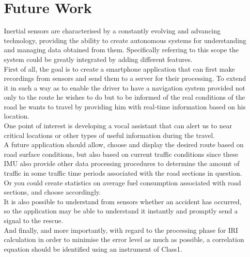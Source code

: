 \documentclass[tesi]{subfiles}
\begin{document}
\section{Future Work}
Inertial sensors are characterised by a constantly evolving and advancing technology, providing the ability to create autonomous systems for understanding and managing data obtained from them. Specifically referring to this scope the system could be greatly integrated by adding different features.\\
First of all, the goal is to create a smartphone application that can first make recordings from sensors and send them to a server for their processing. To extend it in such a way as to enable the driver to have a navigation system provided not only to the route he wishes to do but to be informed of the real conditions of the road he wants to travel by providing him with real-time information based on his location.\\
One point of interest is developing a vocal assistant that can alert us to near critical locations or other types of useful information during the travel.\\
A future application should allow, choose and display the desired route based on road surface conditions, but also based on current traffic conditions since these IMU also provide other data processing procedures to determine the amount of traffic in some traffic time periods associated with the road sections in question. Or you could create statistics on average fuel consumption associated with road sections, and choose accordingly.\\
It is also possible to understand from sensors whether an accident has occurred, so the application may be able to understand it instantly and promptly send a signal to the rescue.\\
And finally, and more importantly, with regard to the processing phase for IRI calculation in order to minimise the error level as much as possible, a correlation equation should be identified using an instrument of Class1.
\end{document}
